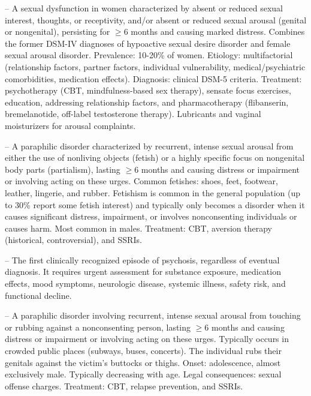 -- A sexual dysfunction in women characterized by absent or reduced sexual interest, thoughts, or receptivity, and/or absent or reduced sexual arousal (genital or nongenital), persisting for \(\ge\)6 months and causing marked distress. Combines the former DSM-IV diagnoses of hypoactive sexual desire disorder and female sexual arousal disorder. Prevalence: 10-20\% of women. Etiology: multifactorial (relationship factors, partner factors, individual vulnerability, medical/psychiatric comorbidities, medication effects). Diagnosis: clinical DSM-5 criteria. Treatment: psychotherapy (CBT, mindfulness-based sex therapy), sensate focus exercises, education, addressing relationship factors, and pharmacotherapy (flibanserin, bremelanotide, off-label testosterone therapy). Lubricants and vaginal moisturizers for arousal complaints.

-- A paraphilic disorder characterized by recurrent, intense sexual arousal from either the use of nonliving objects (fetish) or a highly specific focus on nongenital body parts (partialism), lasting \(\ge\)6 months and causing distress or impairment or involving acting on these urges. Common fetishes: shoes, feet, footwear, leather, lingerie, and rubber. Fetishism is common in the general population (up to 30\% report some fetish interest) and typically only becomes a disorder when it causes significant distress, impairment, or involves nonconsenting individuals or causes harm. Most common in males. Treatment: CBT, aversion therapy (historical, controversial), and SSRIs.

-- The first clinically recognized episode of psychosis, regardless of eventual diagnosis. It requires urgent assessment for substance exposure, medication effects, mood symptoms, neurologic disease, systemic illness, safety risk, and functional decline.

-- A paraphilic disorder involving recurrent, intense sexual arousal from touching or rubbing against a nonconsenting person, lasting \(\ge\)6 months and causing distress or impairment or involving acting on these urges. Typically occurs in crowded public places (subways, buses, concerts). The individual rubs their genitals against the victim's buttocks or thighs. Onset: adolescence, almost exclusively male. Typically decreasing with age. Legal consequences: sexual offense charges. Treatment: CBT, relapse prevention, and SSRIs.


